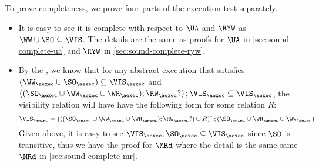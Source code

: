 To prove completeness, we prove four parts of the execution test separately.
\begin{itemize}
\item It is easy to see it is complete with respect to \( \UA \) and \( \RYW \) as \( \WW \cup \SO \subseteq \VIS \).
    The details are the same as proofs for \( \UA \) in \cref{sec:sound-complete-ua} and \( \RYW \) in \cref{sec:sound-complete-ryw}.

\item By the \cite{cerone:snapshot}, we know that for any abstract execution that satisfies \( (\WW_\aexec \cup \SO_\aexec) \subseteq \VIS_\aexec \)
and \( \left( (\SO_\aexec \cup \WW_\aexec \cup \WR_\aexec ) ; \RW_{\aexec}? \right) ; \VIS_\aexec \subseteq \VIS_\aexec \),
the visibility relation will have have the following form for some relation \( R \):
\[
    \VIS_\aexec = \left( \left( (\SO_\aexec \cup \WW_\aexec \cup \WR_\aexec ) ; \RW_{\aexec}? \right)  \cup R \right)^* ; (\SO_\aexec \cup \WR_\aexec \cup \WW_\aexec) 
\]
Given above, it is easy to see \( \VIS_\aexec ; \SO_\aexec \subseteq \VIS_\aexec \) since \( \SO \) is transitive, 
thus we have the proof for \( \MRd \) where the detail is the same same \( \MRd \) in \cref{sec:sound-complete-mr}.


\end{itemize}
